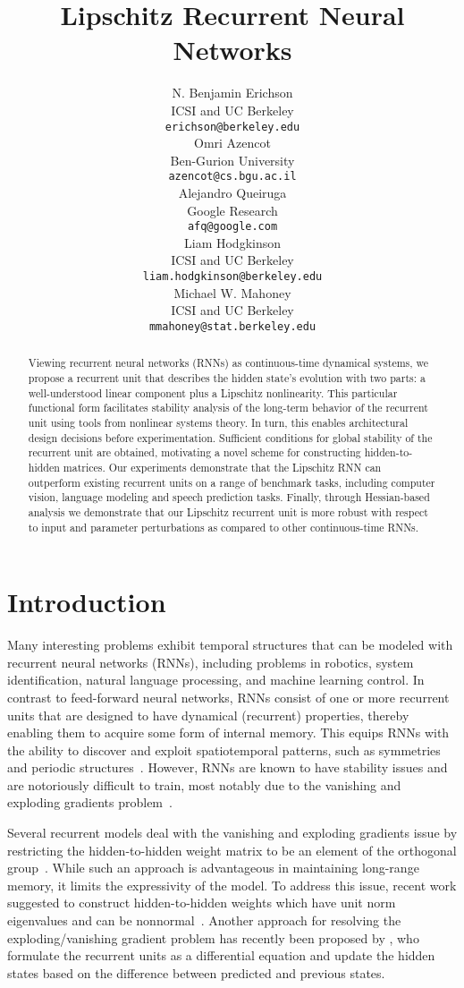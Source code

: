 \documentclass{article} \usepackage{iclr2021_conference,times}
\title{Lipschitz Recurrent Neural Networks}
\author{N. Benjamin Erichson \\
	ICSI and UC Berkeley\\
	\texttt{erichson@berkeley.edu} \\
	\And
	Omri Azencot \\
	Ben-Gurion University \\
	\texttt{azencot@cs.bgu.ac.il} \\
	\And
	Alejandro Queiruga \\
	Google Research \\
	\texttt{afq@google.com} \\
	\AND
	Liam Hodgkinson \\
	ICSI and UC Berkeley \\
	\texttt{liam.hodgkinson@berkeley.edu} \\
	\And	
	Michael W. Mahoney \\
	ICSI and UC Berkeley\\
	\texttt{mmahoney@stat.berkeley.edu} \\
}
\begin{document}
\maketitle

\begin{abstract}
Viewing recurrent neural networks (RNNs) as continuous-time dynamical systems, we propose a recurrent unit that describes the hidden state's evolution with two parts: a well-understood linear component plus a Lipschitz nonlinearity. 
This particular functional form facilitates stability analysis of the long-term behavior of the recurrent unit using tools from nonlinear systems theory. In turn, this enables architectural design decisions before experimentation.
Sufficient conditions for global stability of the recurrent unit are obtained, motivating a novel scheme for constructing hidden-to-hidden matrices.
Our experiments demonstrate that the Lipschitz RNN can outperform existing recurrent units on a range of benchmark tasks, including computer vision, language modeling and speech prediction tasks.
Finally, through Hessian-based analysis we demonstrate that our Lipschitz recurrent unit is more robust with respect to input and parameter perturbations as compared to other continuous-time RNNs.
\end{abstract}


\section{Introduction}

Many interesting problems exhibit temporal structures that can be modeled with recurrent neural networks (RNNs), including problems in robotics, system identification, natural language processing, and machine learning control. In contrast to feed-forward neural networks, RNNs consist of one or more recurrent units that are designed to have dynamical (recurrent) properties, thereby enabling them to acquire some form of internal memory. This equips RNNs with the ability to discover and exploit spatiotemporal patterns, such as symmetries and periodic structures~\citep{hinton1986learning}. However, RNNs are known to have stability issues and are notoriously difficult to train, most notably due to the vanishing and exploding gradients problem~\citep{bengio1994learning,pascanu2013difficulty}. 

Several recurrent models deal with the vanishing and exploding gradients issue by restricting the hidden-to-hidden weight matrix to be an element of the orthogonal group~\citep{arjovsky2016unitary,wisdom2016full,mhammedi2017efficient,vorontsov2017orthogonality,lezcano2019cheap}. 
While such an approach is advantageous in maintaining long-range memory, it limits the expressivity of the model. To address this issue, recent work suggested to construct hidden-to-hidden weights which have unit norm eigenvalues and can be nonnormal~\citep{kerg2019non}. 
Another approach for resolving the exploding/vanishing gradient problem has recently been proposed by \citet{Kag2020RNNs}, who formulate the recurrent units as a differential equation and update the hidden states based on the difference between predicted and previous states.
\end{document}
